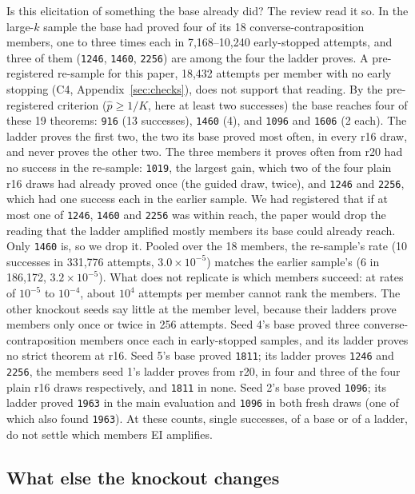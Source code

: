 Is this elicitation of something the base already did? The review read it so. In the large-$k$ sample the base had
proved four of its 18 converse-contraposition members, one to three times each in 7,168--10,240 early-stopped attempts,
and three of them (\texttt{1246}, \texttt{1460}, \texttt{2256}) are among the four the ladder proves. A pre-registered
re-sample for this paper, 18,432 attempts per member with no early stopping (C4, Appendix~\ref{sec:checks}), does not
support that reading. By the pre-registered criterion ($\hat p \geq 1/K$, here at least two successes) the base reaches
four of these 19 theorems: \texttt{916} (13 successes), \texttt{1460} (4), and \texttt{1096} and \texttt{1606} (2 each).
The ladder proves the first two, the two its base proved most often, in every r16 draw, and never proves the other two.
The three members it proves often from r20 had no success in the re-sample: \texttt{1019}, the largest gain, which two
of the four plain r16 draws had already proved once (the guided draw, twice), and \texttt{1246} and \texttt{2256}, which had one success each in the
earlier sample. We had registered that if at most one of \texttt{1246}, \texttt{1460} and
\texttt{2256} was within reach, the paper would drop the reading that the ladder amplified mostly members its base could
already reach. Only \texttt{1460} is, so we drop it. Pooled over the 18 members, the re-sample's rate (10 successes in
331,776 attempts, $3.0\times10^{-5}$) matches the earlier sample's (6 in 186,172, $3.2\times10^{-5}$). What does not
replicate is which members succeed: at rates of $10^{-5}$ to $10^{-4}$, about $10^4$ attempts per member cannot rank
the members. The other knockout seeds say little at the member level, because their ladders prove members only once or twice in
256 attempts. Seed 4's base proved three converse-contraposition members once each in early-stopped samples, and its
ladder proves no strict theorem at r16. Seed 5's base proved \texttt{1811}; its ladder proves \texttt{1246} and
\texttt{2256}, the members seed 1's ladder proves from r20, in four and three of the four plain r16 draws respectively, and
\texttt{1811} in none. Seed
2's base proved \texttt{1096}; its ladder proved \texttt{1963} in the main evaluation and \texttt{1096} in both fresh
draws (one of which also found \texttt{1963}).
At these counts, single successes, of a base or of a ladder, do not settle which members EI amplifies.

\subsection{What else the knockout changes}
\label{sec:side}

